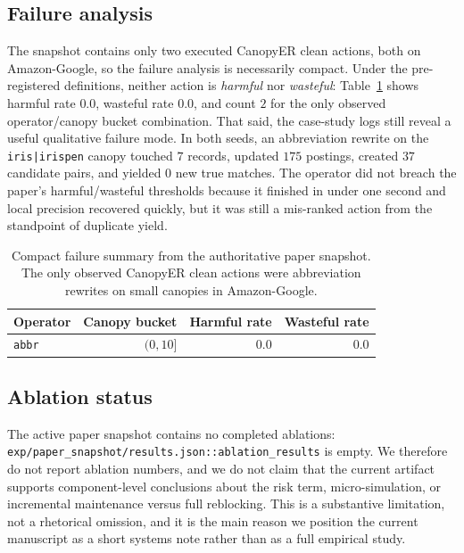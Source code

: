 \documentclass{article}
\newcommand{\method}{CanopyER}
\begin{document}
\subsection{Failure analysis}

The snapshot contains only two executed \method{} clean actions, both on Amazon-Google, so the failure analysis is necessarily compact. Under the pre-registered definitions, neither action is \emph{harmful} nor \emph{wasteful}: Table~\ref{tab:failure} shows harmful rate $0.0$, wasteful rate $0.0$, and count $2$ for the only observed operator/canopy bucket combination. That said, the case-study logs still reveal a useful qualitative failure mode. In both seeds, an abbreviation rewrite on the \texttt{iris|irispen} canopy touched $7$ records, updated $175$ postings, created $37$ candidate pairs, and yielded $0$ new true matches. The operator did not breach the paper's harmful/wasteful thresholds because it finished in under one second and local precision recovered quickly, but it was still a mis-ranked action from the standpoint of duplicate yield.

\begin{table}[t]
\caption{Compact failure summary from the authoritative paper snapshot. The only observed \method{} clean actions were abbreviation rewrites on small canopies in Amazon-Google.}
\label{tab:failure}
\centering
\small
\begin{tabular}{lrrr}
\toprule
Operator & Canopy bucket & Harmful rate & Wasteful rate \\
\midrule
\texttt{abbr} & $(0,10]$ & 0.0 & 0.0 \\
\bottomrule
\end{tabular}
\end{table}

\subsection{Ablation status}

The active paper snapshot contains no completed ablations: \texttt{exp/paper\_snapshot/results.json::ablation\_results} is empty. We therefore do not report ablation numbers, and we do not claim that the current artifact supports component-level conclusions about the risk term, micro-simulation, or incremental maintenance versus full reblocking. This is a substantive limitation, not a rhetorical omission, and it is the main reason we position the current manuscript as a short systems note rather than as a full empirical study.
\end{document}
